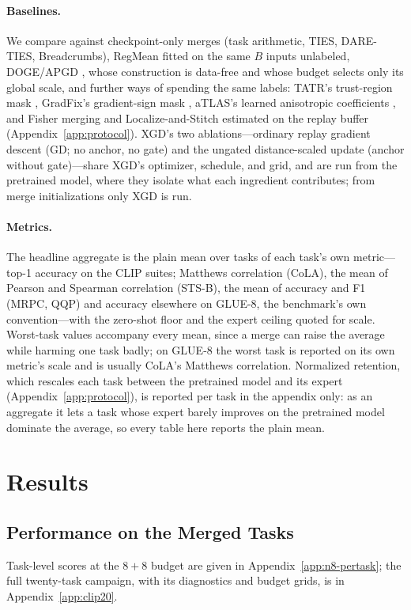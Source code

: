 \documentclass{article} %
\begin{document}
\paragraph{Baselines.}
We compare against checkpoint-only merges (task arithmetic, TIES, DARE-TIES, Breadcrumbs), RegMean fitted on the same $B$ inputs unlabeled, DOGE/APGD \citep{wei2025apgd}, whose construction is data-free and whose budget selects only its global scale, and further ways of spending the same labels: TATR's trust-region mask \citep{sun2025tatr}, GradFix's gradient-sign mask \citep{rinaldi2025gradfix}, aTLAS's learned anisotropic coefficients \citep{zhang2024atlas}, and Fisher merging and Localize-and-Stitch estimated on the replay buffer (Appendix~\ref{app:protocol}). XGD's two ablations---ordinary replay gradient descent (GD; no anchor, no gate) and the ungated distance-scaled update (anchor without gate)---share XGD's optimizer, schedule, and grid, and are run from the pretrained model, where they isolate what each ingredient contributes; from merge initializations only XGD is run.

\paragraph{Metrics.}
The headline aggregate is the plain mean over tasks of each task's own metric---top-1 accuracy on the CLIP suites; Matthews correlation (CoLA), the mean of Pearson and Spearman correlation (STS-B), the mean of accuracy and F1 (MRPC, QQP) and accuracy elsewhere on GLUE-8, the benchmark's own convention---with the zero-shot floor and the expert ceiling quoted for scale. Worst-task values accompany every mean, since a merge can raise the average while harming one task badly; on GLUE-8 the worst task is reported on its own metric's scale and is usually CoLA's Matthews correlation. Normalized retention, which rescales each task between the pretrained model and its expert (Appendix~\ref{app:protocol}), is reported per task in the appendix only: as an aggregate it lets a task whose expert barely improves on the pretrained model dominate the average, so every table here reports the plain mean.

\section{Results}
\label{sec:results}
\subsection{Performance on the Merged Tasks}
\label{sec:merged-task-performance}
Task-level scores at the $8{+}8$ budget are given in Appendix~\ref{app:n8-pertask}; the full twenty-task campaign, with its diagnostics and budget grids, is in Appendix~\ref{app:clip20}.
\end{document}
